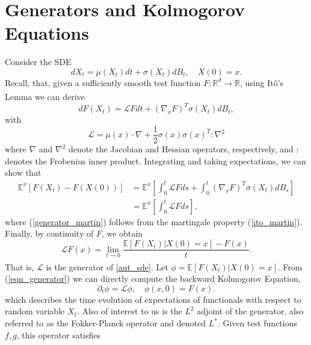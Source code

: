 \documentclass[11pt, twoside]{report}
\begin{document}
\section{Generators and Kolmogorov Equations}
Consider the SDE
\begin{equation} \label{aut_sde}
    dX_t = \mu(X_t) dt + \sigma(X_t) dB_t, \quad X(0) = x.
\end{equation}
Recall, that, given a sufficiently smooth test function $F: \mathbb{R}^d \xrightarrow[]{} \mathbb{R}$, using It\^{o}'s Lemma we can derive
\begin{equation} \label{ito_lem_gen}
    dF(X_t) = \mathcal{L}F dt + (\nabla_x F)^T \sigma(X_t) dB_t,
\end{equation}
with
\begin{equation} \label{generator_explicit}
    \mathcal{L} = \mu(x) \cdot \nabla + \frac{1}{2}\sigma(x)\sigma(x)^T : \nabla^2
\end{equation}
 where $\nabla$ and $\nabla^2$ denote the Jacobian and Hessian operators, respectively, and $:$ denotes the Frobenius inner product. Integrating and taking expectations, we can show that
\begin{align}
    \mathbb{E}^x\left[F(X_t) - F(X(0))\right] &= \mathbb{E}^x\left[\int_0^t \mathcal{L}F ds + \int_0^t (\nabla_x F)^T \sigma(X_t) dB_s \right] \label{generator_int} \\
    &= \mathbb{E}^x\left[\int_0^t \mathcal{L}F ds \right] \label{generator_martin},
\end{align}
where (\ref{generator_martin}) follows from the martingale property (\ref{ito_martin}). Finally, by continuity of $F$, we obtain
\begin{equation} \label{eqn_generator}
    \mathcal{L}F(x) = \lim_{t \xrightarrow[]{} 0}\frac{\mathbb{E}\left[F(X_t) | X(0) = x \right]- F(x)}{t}.
\end{equation}
That is, $\mathcal{L}$ is the generator of \ref{aut_sde}. Let $\phi = \mathbb{E}\left[F(X_t) | X(0) = x \right]$. From (\ref{eqn_generator}) we can directly compute the backward Kolmogorov Equation,
\begin{equation} \label{eqn_BKE}
    \partial_t \phi = \mathcal{L} \phi, \quad \phi(x,0) = F(x).
\end{equation}
which describes the time evolution of expectations of functionals with respect to random variable $X_t$. Also of interest to us is the $L^2$ adjoint of the generator, also referred to as the Fokker-Planck operator and denoted $L^*$. Given test functions $f,g$, this operator satisfies
\end{document}
